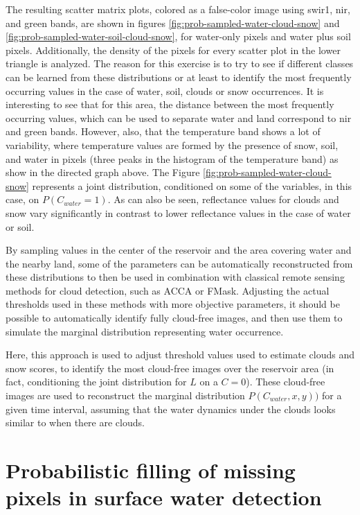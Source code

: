 The resulting scatter matrix plots, colored as a false-color image using swir1, nir, and green bands, are shown in figures \ref{fig:prob-sampled-water-cloud-snow} and \ref{fig:prob-sampled-water-soil-cloud-snow}, for water-only pixels and water plus soil pixels. Additionally, the density of the pixels for every scatter plot in the lower triangle is analyzed. The reason for this exercise is to try to see if different classes can be learned from these distributions or at least to identify the most frequently occurring values in the case of water, soil, clouds or snow occurrences. It is interesting to see that for this area, the distance between the most frequently occurring values, which can be used to separate water and land correspond to nir and green bands. However, also, that the temperature band shows a lot of variability, where temperature values are formed by the presence of snow, soil, and water in pixels (three peaks in the histogram of the temperature band) as show in the directed graph above. The Figure \ref{fig:prob-sampled-water-cloud-snow} represents a joint distribution, conditioned on some of the variables, in this case, on $P(C_{water}=1)$. As can also be seen, reflectance values for clouds and snow vary significantly in contrast to lower reflectance values in the case of water or soil. 

By sampling values in the center of the reservoir and the area covering water and the nearby land, some of the parameters can be automatically reconstructed from these distributions to then be used in combination with classical remote sensing methods for cloud detection, such as ACCA or FMask. Adjusting the actual thresholds used in these methods with more objective parameters, it should be possible to automatically identify fully cloud-free images, and then use them to simulate the marginal distribution representing water occurrence. 

Here, this approach is used to adjust threshold values used to estimate clouds and snow scores, to identify the most cloud-free images over the reservoir area (in fact, conditioning the joint distribution for $L$ on a $C=0$). These cloud-free images are used to reconstruct the marginal distribution $P(C_{water}, x, y))$ for a given time interval, assuming that the water dynamics under the clouds looks similar to when there are clouds.

\section{Probabilistic filling of missing pixels in surface water detection}

